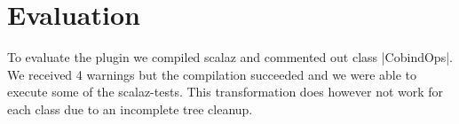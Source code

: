 \section{Evaluation}

To evaluate the plugin we compiled scalaz and commented out class |CobindOps|. We received 4 warnings but the compilation succeeded and we were able to execute some of the scalaz-tests. This transformation does however not work for each class due to an incomplete tree cleanup.